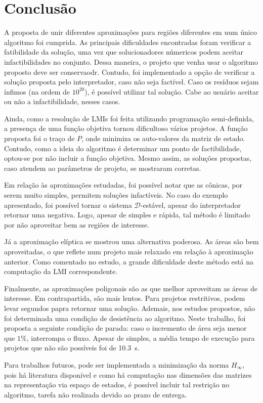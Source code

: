 \chapter{Conclusão}
A proposta de unir diferentes aproximações para regiões diferentes em uum único algoritmo foi cumprida. As principais dificuldades encontradas foram verificar a fatibilidade da solução, uma vez que solucionadores númericos podem aceitar infactibilidades no conjunto. Dessa maneira, o projeto que venha usar o algoritmo proposto deve ser conservaodr. Contudo, foi implementado a opção de verificar a solução proposta pelo interpretador, caso não seja factível. Caso os resíduos sejam ínfimos (na ordem de $10^{20}$), é possível utilizar tal solução. Cabe ao usuário aceitar ou não a infactibilidade, nesses casos.

Ainda, como a resolução de LMIs foi feita utilizando programação semi-definida, a presença de uma função objetiva tornou dificultoso vários projetos. A função proposta foi o traço de $P$, onde minimiza os auto-valores da matriz de estado. Contudo, como a ideia do algoritmo é determinar um ponto de factibilidade, optou-se por não incluir a função objetiva. Mesmo assim, as soluções propostas, caso atendem ao parâmetros de projeto, se mostraram corretas.

Em relação às aproximações estudadas, foi possível notar que as cônicas, por serem muito simples, permitem soluções infactíveis. No caso do exemplo apresentado, foi possível tornar o sistema $\mathscr{D}$-estável, apesar do interpretador retornar uma negativa. Logo, apesar de simples e rápida, tal método é limitado por não aproveitar bem as regiões de interesse.

Já a aproximação elíptica se mostrou uma alternativa poderosa. As áreas são bem aproveitadas, o que reflete num projeto mais relaxado em relação à aproximação anterior. Como comentado no estudo, a grande dificuldade deste método está na computação da LMI correspondente.

Finalmente, as aproximações poligonais são as que melhor aproveitam as áreas de interesse. Em contrapartida, são mais lentos. Para projetos restritivos, podem levar segundos papra retornar uma solução. Ademais, nos estudos propostos, não foi determinada uma condição de desistência ao algoritmo. Neste trabalho, foi proposta a seguinte condição de parada: caso o incremento de área seja menor que $1\%$, interrompa o fluxo. Apesar de simples, a média tempo de execução para projetos que não são possíveis foi de \SI{10.3}{\second}.

Para trabalhos futuros, pode ser implementada a minimização da norma $H_{\infty}$, pois há literatura disponível e como há computação nas dimensões das matrizes na representação via espaço de estados, é possível incluir tal restrição no algoritmo, tarefa não realizada devido ao prazo de entrega.